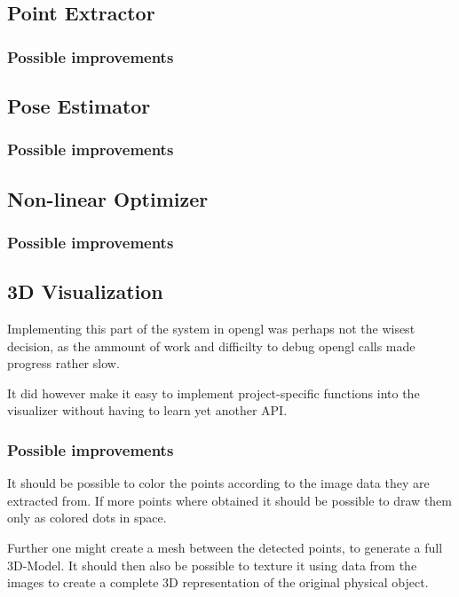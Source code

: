 
\subsection{Point Extractor}


\subsubsection{Possible improvements}


\subsection{Pose Estimator}


\subsubsection{Possible improvements}


\subsection{Non-linear Optimizer}


\subsubsection{Possible improvements}


\pagebreak
\subsection{3D Visualization}
Implementing this part of the system in opengl was perhaps not the wisest decision, as the ammount of work and difficilty to debug opengl calls made progress rather slow.

It did however make it easy to implement project-specific functions into the visualizer without having to learn yet another API.

\subsubsection{Possible improvements}
It should be possible to color the points according to the image data they are extracted from. If more points where obtained it should be possible to draw them only as colored dots in space.

Further one might create a mesh between the detected points, to generate a full 3D-Model. It should then also be possible to texture it using data from the images to create a complete 3D representation of the original physical object.
